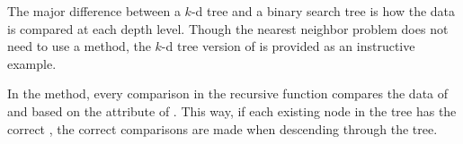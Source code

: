 The major difference between a $k$-d tree and a binary search tree is how the data is compared at each depth level.
Though the nearest neighbor problem does not need to use a  method, the $k$-d tree version of  is provided as an instructive example.

In the  method, every comparison in the recursive  function compares the data of  and  based on the  attribute of .
This way, if each existing node in the tree has the correct , the correct comparisons are made when descending through the tree.

